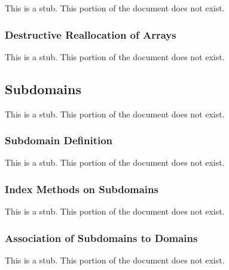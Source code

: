 This is a stub.  This portion of the document does not exist.

\subsubsection{Destructive Reallocation of Arrays}
\label{Destructive_Reallocation_of_Arrays}

This is a stub.  This portion of the document does not exist.

\subsection{Subdomains}
\label{Subdomains}

This is a stub.  This portion of the document does not exist.

\subsubsection{Subdomain Definition}
\label{Subdomain_Definition}

This is a stub.  This portion of the document does not exist.

\subsubsection{Index Methods on Subdomains}
\label{Index_Methods_on_Subdomains}

This is a stub.  This portion of the document does not exist.

\subsubsection{Association of Subdomains to Domains}
\label{Association_of_Subdomains_to_Domains}

This is a stub.  This portion of the document does not exist.
